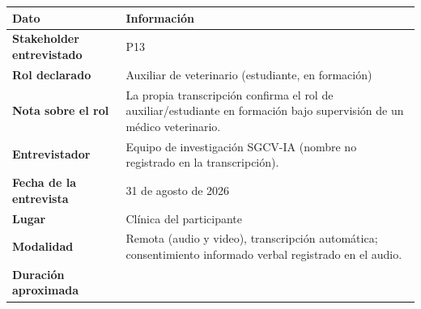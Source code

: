 \documentclass[
]{article}
\newcounter{none} %
\begin{document}
{\def\LTcaptype{none} %
\begin{longtable}[]{|
  >{\raggedright\arraybackslash}p{}|
  >{\raggedright\arraybackslash}p{}|}
\hline
\begin{minipage}[b]{\linewidth}\centering
\textbf{Dato}
\end{minipage} & \begin{minipage}[b]{\linewidth}\centering
\textbf{Información}
\end{minipage} \\
\hline
\endhead
\hline
\endlastfoot
\textbf{Stakeholder entrevistado} & \begin{minipage}[t]{\linewidth}\raggedright
P13
\end{minipage} \\
\hline
\textbf{Rol declarado} & \begin{minipage}[t]{\linewidth}\raggedright
Auxiliar de veterinario (estudiante, en formación)
\end{minipage} \\
\hline
\textbf{Nota sobre el rol} & \begin{minipage}[t]{\linewidth}\raggedright
La propia transcripción confirma el rol de auxiliar/estudiante en formación bajo supervisión de un médico veterinario.
\end{minipage} \\
\hline
\textbf{Entrevistador} & \begin{minipage}[t]{\linewidth}\raggedright
Equipo de investigación SGCV-IA (nombre no registrado en la transcripción).
\end{minipage} \\
\hline
\textbf{Fecha de la entrevista} & \begin{minipage}[t]{\linewidth}\raggedright
31 de agosto de 2026
\end{minipage} \\
\hline
\textbf{Lugar} & \begin{minipage}[t]{\linewidth}\raggedright
Clínica del participante
\end{minipage} \\
\hline
\textbf{Modalidad} & \begin{minipage}[t]{\linewidth}\raggedright
Remota (audio y video), transcripción automática; consentimiento informado verbal registrado en el audio.
\end{minipage} \\
\hline
\textbf{Duración aproximada} & \begin{minipage}[t]{\linewidth}\raggedright

\end{minipage}
\end{longtable}}
\end{document}
